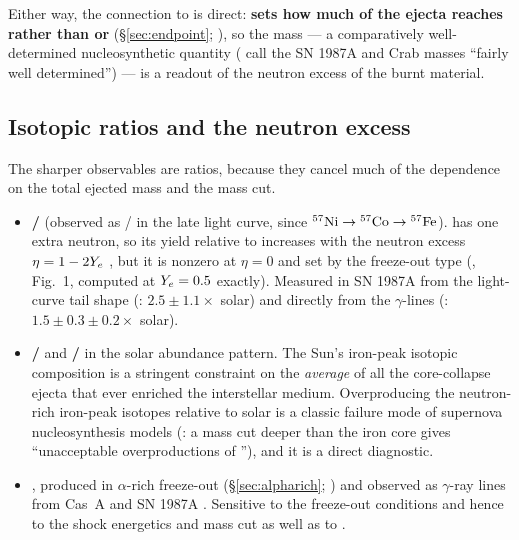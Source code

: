 Either way, the connection to \Ye{} is direct: \textbf{\Ye{} sets how much of
the ejecta reaches  rather than  or }
(\S\ref{sec:endpoint}; \citealt{woosley2007}), so the  mass --- a
comparatively well-determined nucleosynthetic quantity (\citealt{sukhbold2016}
call the SN 1987A and Crab  masses ``fairly well determined'') ---
is a readout of the neutron excess of the burnt material.

\subsection{Isotopic ratios and the neutron excess}
\label{sec:isotopicratios}

The sharper observables are ratios, because they cancel much of the dependence
on the total ejected mass and the mass cut.

\begin{itemize}
\item \textbf{/} (observed as /
  in the late light curve, since $\nuc{Ni}{57} \to \nuc{Co}{57} \to
  \nuc{Fe}{57}$).  has one extra neutron, so its yield relative to
   increases with the neutron excess $\eta = 1 - 2\Ye$
  , but it is nonzero at $\eta = 0$ and set by the
  freeze-out type (\citealt{seitenzahl2014}, Fig.~1, computed at $\Ye = 0.5$
  exactly). Measured in SN 1987A from the light-curve tail shape
  (\citealt{seitenzahl2014}: $2.5 \pm 1.1 \times$ solar) and directly from the
   $\gamma$-lines (\citealt{kurfess1992}: $1.5 \pm 0.3 \pm 0.2
  \times$ solar).
\item \textbf{/} and \textbf{/}
  in the solar abundance pattern. The Sun's iron-peak isotopic composition is a
  stringent constraint on the \emph{average} \Ye{} of all the core-collapse
  ejecta that ever enriched the interstellar medium. Overproducing the
  neutron-rich iron-peak isotopes relative to solar is a classic failure mode
  of supernova nucleosynthesis models (\citealt{woosley2007}: a mass cut deeper
  than the iron core gives ``unacceptable overproductions of ''),
  and it is a direct \Ye{} diagnostic.
\item \textbf{}, produced in $\alpha$-rich freeze-out
  (\S\ref{sec:alpharich}; \citealt{the1998}) and observed as $\gamma$-ray lines
  from Cas~A \citep{grefenstette2014} and SN 1987A \citep{boggs2015}. Sensitive
  to the freeze-out conditions and hence to the shock energetics and mass cut
  as well as to \Ye.
\end{itemize}

